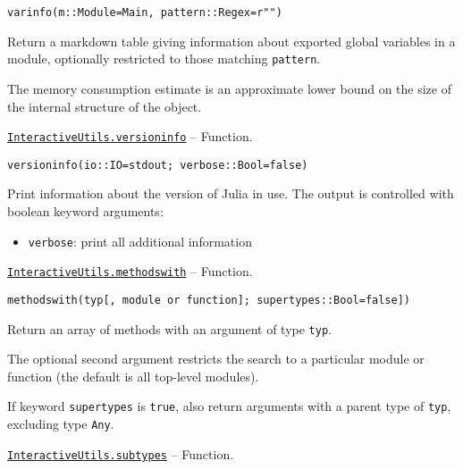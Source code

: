 \begin{adjustwidth}{2em}{0pt}


\begin{verbatim}
varinfo(m::Module=Main, pattern::Regex=r"")
\end{verbatim}

Return a markdown table giving information about exported global variables in a module, optionally restricted to those matching \texttt{pattern}.

The memory consumption estimate is an approximate lower bound on the size of the internal structure of the object.



\end{adjustwidth}
\hypertarget{11698106121547091928}{} 
\hyperlink{11698106121547091928}{\texttt{InteractiveUtils.versioninfo}}  -- {Function.}

\begin{adjustwidth}{2em}{0pt}


\begin{verbatim}
versioninfo(io::IO=stdout; verbose::Bool=false)
\end{verbatim}

Print information about the version of Julia in use. The output is controlled with boolean keyword arguments:

\begin{itemize}
\item \texttt{verbose}: print all additional information

\end{itemize}


\end{adjustwidth}
\hypertarget{1845157398882896709}{} 
\hyperlink{1845157398882896709}{\texttt{InteractiveUtils.methodswith}}  -- {Function.}

\begin{adjustwidth}{2em}{0pt}


\begin{verbatim}
methodswith(typ[, module or function]; supertypes::Bool=false])
\end{verbatim}

Return an array of methods with an argument of type \texttt{typ}.

The optional second argument restricts the search to a particular module or function (the default is all top-level modules).

If keyword \texttt{supertypes} is \texttt{true}, also return arguments with a parent type of \texttt{typ}, excluding type \texttt{Any}.



\end{adjustwidth}
\hypertarget{13112219412833772146}{} 
\hyperlink{13112219412833772146}{\texttt{InteractiveUtils.subtypes}}  -- {Function.}

